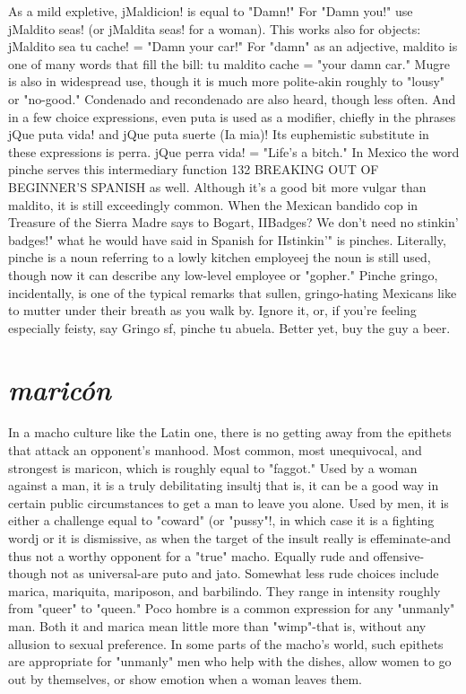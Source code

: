 \documentclass[14pt,a4paper,oneside]{memoir}
\begin{document}
As a mild expletive, jMaldicion! is equal to "Damn!" For
"Damn you!" use jMaldito seas! (or jMaldita seas! for a woman). This
works also for objects: jMaldito sea tu cache! = "Damn your car!" For
"damn" as an adjective, maldito is one of many words that fill the bill:
tu maldito cache = "your damn car." Mugre is also in widespread use,
though it is much more polite-akin roughly to "lousy" or "no-good."
Condenado and recondenado are also heard, though less often. And in
a few choice expressions, even puta is used as a modifier, chiefly in the
phrases jQue puta vida! and jQue puta suerte (Ia mia)! Its euphemistic substitute in these expressions is perra. jQue perra vida! = "Life's
a bitch."
In Mexico the word pinche serves this intermediary function
132 BREAKING OUT OF BEGINNER'S SPANISH
as well. Although it's a good bit more vulgar than maldito, it is still
exceedingly common. When the Mexican bandido cop in Treasure of
the Sierra Madre says to Bogart, IIBadges? We don't need no stinkin'
badges!" what he would have said in Spanish for IIstinkin'" is pinches.
Literally, pinche is a noun referring to a lowly kitchen employeej the
noun is still used, though now it can describe any low-level employee
or "gopher." Pinche gringo, incidentally, is one of the typical remarks
that sullen, gringo-hating Mexicans like to mutter under their breath
as you walk by. Ignore it, or, if you're feeling especially feisty, say
Gringo sf, pinche tu abuela. Better yet, buy the guy a beer.

\section{\emph{maricón}}

In a macho culture like the Latin one, there is no getting away
from the epithets that attack an opponent's manhood. Most common,
most unequivocal, and strongest is maricon, which is roughly equal to
"faggot." Used by a woman against a man, it is a truly debilitating insultj that is, it can be a good way in certain public circumstances to get
a man to leave you alone. Used by men, it is either a challenge equal to
"coward" (or "pussy"!, in which case it is a fighting wordj or it is dismissive, as when the target of the insult really is effeminate-and thus
not a worthy opponent for a "true" macho. Equally rude and offensive-though not as universal-are puto and jato. Somewhat less rude
choices include marica, mariquita, mariposon, and barbilindo. They
range in intensity roughly from "queer" to "queen." Poco hombre is a
common expression for any "unmanly" man. Both it and marica mean
little more than "wimp"-that is, without any allusion to sexual preference. In some parts of the macho's world, such epithets are appropriate for "unmanly" men who help with the dishes, allow women to go
out by themselves, or show emotion when a woman leaves them.
\end{document}
